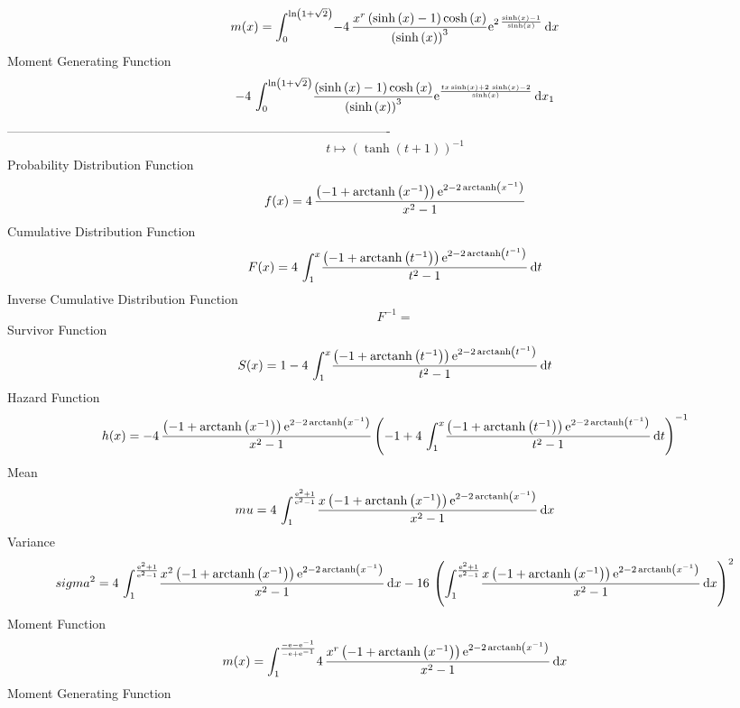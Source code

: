 \documentclass[12pt]{article}
\begin{document}
 $$ m(x) = \int_{0}^{\ln  \left( 1+\sqrt {2} \right) }\!-4\,{\frac {{x}^{r}
 \left( \sinh \left( x \right) -1 \right) \cosh \left( x \right) }{
 \left( \sinh \left( x \right)  \right) ^{3}}{{\rm e}^{2\,{\frac {
\sinh \left( x \right) -1}{\sinh \left( x \right) }}}}}\,{\rm d}x
$$ Moment Generating Function 
 $$-4\,\int_{0}^{\ln  \left( 1+\sqrt {2} \right) }\!{\frac { \left( \sinh
 \left( x \right) -1 \right) \cosh \left( x \right) }{ \left( \sinh
 \left( x \right)  \right) ^{3}}{{\rm e}^{{\frac {tx\sinh \left( x
 \right) +2\,\sinh \left( x \right) -2}{\sinh \left( x \right) }}}}}
\,{\rm d}x_{{1}}
$$-------------------------------------------------------------------------------------------  \\$$t\mapsto  \left( \tanh \left( t+1 \right)  \right) ^{-1}
$$Probability Distribution Function 
$$  f(x)=4\,{\frac { \left( -1+{\rm arctanh} \left({x}^{-1}\right) \right) {
{\rm e}^{2-2\,{\rm arctanh} \left({x}^{-1}\right)}}}{{x}^{2}-1}}
$$Cumulative Distribution Function  
 $$F(x)=4\,\int_{1}^{x}\!{\frac { \left( -1+{\rm arctanh} \left({t}^{-1}
\right) \right) {{\rm e}^{2-2\,{\rm arctanh} \left({t}^{-1}\right)}}}{
{t}^{2}-1}}\,{\rm d}t
$$ Inverse Cumulative Distribution Function 
  $$F^{-1} = $$Survivor Function 
 $$ S(x)=1-4\,\int_{1}^{x}\!{\frac { \left( -1+{\rm arctanh} \left({t}^{-1}
\right) \right) {{\rm e}^{2-2\,{\rm arctanh} \left({t}^{-1}\right)}}}{
{t}^{2}-1}}\,{\rm d}t
$$ Hazard Function 
 $$ h(x)=-4\,{\frac { \left( -1+{\rm arctanh} \left({x}^{-1}\right) \right) {
{\rm e}^{2-2\,{\rm arctanh} \left({x}^{-1}\right)}}}{{x}^{2}-1}
 \left( -1+4\,\int_{1}^{x}\!{\frac { \left( -1+{\rm arctanh} \left({t}
^{-1}\right) \right) {{\rm e}^{2-2\,{\rm arctanh} \left({t}^{-1}
\right)}}}{{t}^{2}-1}}\,{\rm d}t \right) ^{-1}}
$$Mean 
 $$ mu=4\,\int_{1}^{{\frac {{{\rm e}^{2}}+1}{{{\rm e}^{2}}-1}}}\!{\frac {x
 \left( -1+{\rm arctanh} \left({x}^{-1}\right) \right) {{\rm e}^{2-2\,
{\rm arctanh} \left({x}^{-1}\right)}}}{{x}^{2}-1}}\,{\rm d}x
$$ Variance 
 $$ sigma^2 = 4\,\int_{1}^{{\frac {{{\rm e}^{2}}+1}{{{\rm e}^{2}}-1}}}\!{\frac {{x}^
{2} \left( -1+{\rm arctanh} \left({x}^{-1}\right) \right) {{\rm e}^{2-
2\,{\rm arctanh} \left({x}^{-1}\right)}}}{{x}^{2}-1}}\,{\rm d}x-16\,
 \left( \int_{1}^{{\frac {{{\rm e}^{2}}+1}{{{\rm e}^{2}}-1}}}\!{\frac 
{x \left( -1+{\rm arctanh} \left({x}^{-1}\right) \right) {{\rm e}^{2-2
\,{\rm arctanh} \left({x}^{-1}\right)}}}{{x}^{2}-1}}\,{\rm d}x
 \right) ^{2}
$$Moment Function 
 $$ m(x) = \int_{1}^{{\frac {-{\rm e}-{{\rm e}^{-1}}}{-{\rm e}+{{\rm e}^{-1}}}}}
\!4\,{\frac {{x}^{r} \left( -1+{\rm arctanh} \left({x}^{-1}\right)
 \right) {{\rm e}^{2-2\,{\rm arctanh} \left({x}^{-1}\right)}}}{{x}^{2}
-1}}\,{\rm d}x
$$ Moment Generating Function 
\end{document}
